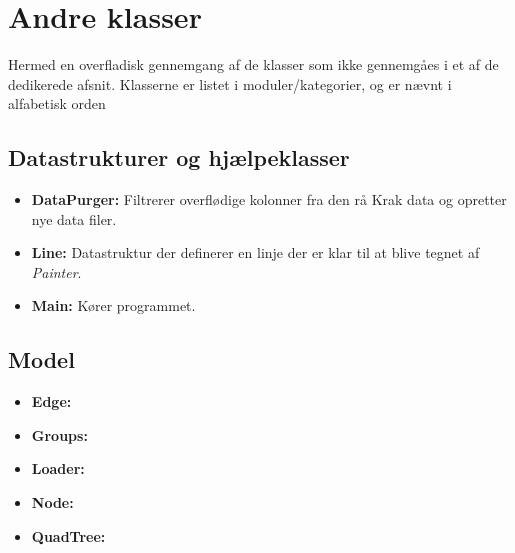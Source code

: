 \section{Andre klasser}

Hermed en overfladisk gennemgang af de klasser som ikke gennemgåes i et af de dedikerede afsnit. Klasserne er listet i moduler/kategorier, og er nævnt i alfabetisk orden

\subsection{Datastrukturer og hjælpeklasser}

\begin{itemize}
	\item \textbf{DataPurger:} Filtrerer overflødige kolonner fra den rå Krak data og opretter nye data filer.
	\item \textbf{Line:} Datastruktur der definerer en linje der er klar til at blive tegnet af \emph{Painter}.
	\item \textbf{Main:} Kører programmet.
\end{itemize}

\subsection{Model}

\begin{itemize}
	\item \textbf{Edge:}
	\item \textbf{Groups:}
	\item \textbf{Loader:}
	\item \textbf{Node:}
	\item \textbf{QuadTree:}
\end{itemize}